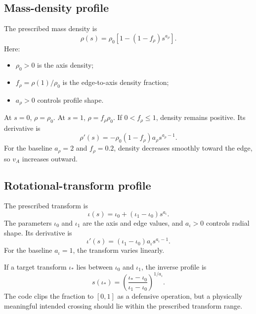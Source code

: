 \subsection{Mass-density profile}
The prescribed mass density is
\begin{equation}
\boxed{
\rho(s)=\rho_0\left[1-(1-f_\rho)s^{a_\rho}\right].}
\label{eq:benchmark_density}
\end{equation}
Here:
\begin{itemize}[leftmargin=1.6em]
\item $\rho_0>0$ is the axis density;
\item $f_\rho=\rho(1)/\rho_0$ is the edge-to-axis density fraction;
\item $a_\rho>0$ controls profile shape.
\end{itemize}
At $s=0$, $\rho=\rho_0$. At $s=1$, $\rho=f_\rho\rho_0$. If $0<f_\rho\le1$, density remains positive. Its derivative is
\begin{equation}
\rho'(s)=-\rho_0(1-f_\rho)a_\rho s^{a_\rho-1}.
\end{equation}
For the baseline $a_\rho=2$ and $f_\rho=0.2$, density decreases smoothly toward the edge, so $v_A$ increases outward.

\subsection{Rotational-transform profile}
The prescribed transform is
\begin{equation}
\boxed{
\iota(s)=\iota_0+(\iota_1-\iota_0)s^{a_\iota}.}
\label{eq:benchmark_iota}
\end{equation}
The parameters $\iota_0$ and $\iota_1$ are the axis and edge values, and $a_\iota>0$ controls radial shape. Its derivative is
\begin{equation}
\iota'(s)=(\iota_1-\iota_0)a_\iota s^{a_\iota-1}.
\end{equation}
For the baseline $a_\iota=1$, the transform varies linearly.

If a target transform $\iota_*$ lies between $\iota_0$ and $\iota_1$, the inverse profile is
\begin{equation}
\boxed{
s(\iota_*)=
\left(\frac{\iota_*-\iota_0}{\iota_1-\iota_0}\right)^{1/a_\iota}.}
\label{eq:iota_inverse}
\end{equation}
The code clips the fraction to $[0,1]$ as a defensive operation, but a physically meaningful intended crossing should lie within the prescribed transform range.

